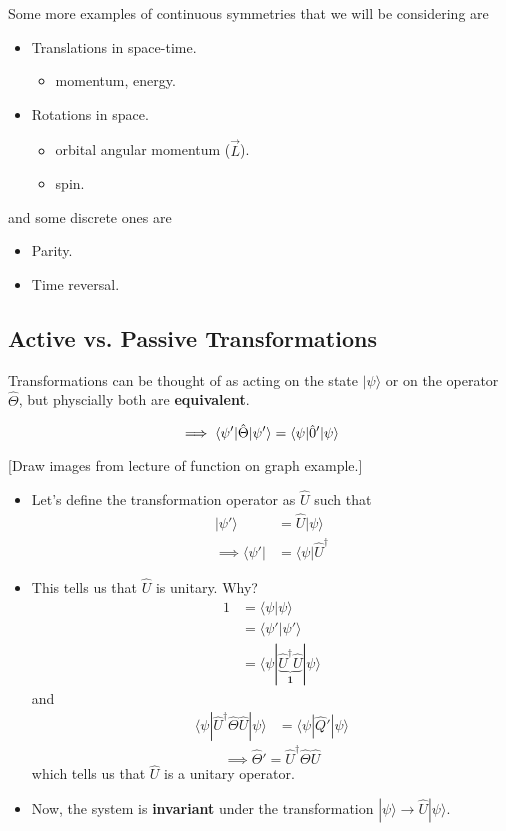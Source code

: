 \documentclass{article}
\newcommand{\ket}[1]{|#1 \rangle}
\newcommand{\bra}[1]{\langle #1|}
\newcommand{\inner}[2]{\langle #1 | #2 \rangle}
\begin{document}
\vskip 0.5cm
Some more examples of continuous symmetries that we will be considering are 
\begin{itemize}
  \item Translations in space-time.
  \begin{itemize}
    \item momentum, energy.
  \end{itemize}
  \item Rotations in space.
  \begin{itemize}
    \item orbital angular momentum ($\vec{L}$).
    \item spin.
  \end{itemize}
\end{itemize}
and some discrete ones are 
\begin{itemize}
  \item Parity.
  \item Time reversal.
\end{itemize}

\vskip 1cm
\subsection*{Active vs. Passive Transformations}
Transformations can be thought of as acting on the state $\ket{\psi}$ or on the operator $\hat{\Theta}$, but physcially both are \textbf{equivalent}. 

\[ \implies \inner{\psi'}{\hat{\Theta}| \psi'} = \inner{\psi}{\hat{\theHtable}'|\psi} \]

\vskip 0.5cm
[Draw images from lecture of function on graph example.]

\begin{itemize}
  \item Let's define the transformation operator as $\hat{U}$ such that 
  \begin{align*}
    \ket{\psi'} &= \hat{U} \ket{\psi} \\
    \implies \bra{\psi'} &= \bra{\psi} \hat{U}^{\dagger}
  \end{align*}

  \item This tells us that $\hat{U}$ is unitary. Why? 
  \begin{align*}
    1 &= \inner{\psi}{\psi} \\
    &= \inner{\psi'}{\psi'} \\
    &= \inner{\psi|\underbrace{\hat{U}^{\dagger} \hat{U} }_{\mathbf{1}}}{\psi}
  \end{align*}
  and 
  \begin{align*}
    \inner{\psi|\hat{U}^{\dagger} \hat{\Theta} \hat{U} }{\psi} &= \inner{\psi}{\hat{Q}' | \psi} 
  \end{align*}
  \[ \implies \hat{\Theta}' = \hat{U}^{\dagger} \hat{\Theta} \hat{U} \]
  which tells us that $\hat{U}$ is a unitary operator.

  \item Now, the system is \textbf{invariant} under the transformation $\ket{\psi} \rightarrow \hat{U} \ket{\psi}$.
\end{itemize}
\end{document}
